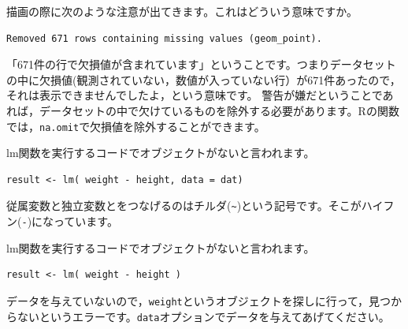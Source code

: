 \documentclass{ltjsbook}
\begin{document}

\begin{FAQ}{描画の際に次のような注意が出てきます。これはどういう意味ですか。}{}
\begin{verbatim}Removed 671 rows containing missing values (geom_point).\end{verbatim}
「671件の行で欠損値が含まれています」ということです。つまりデータセットの中に欠損値(観測されていない，数値が入っていない行）が671件あったので，それは表示できませんでしたよ，という意味です。
警告が嫌だということであれば，データセットの中で欠けているものを除外する必要があります。Rの関数では，\verb|na.omit|で欠損値を除外することができます。
\end{FAQ}

\begin{FAQ}{lm関数を実行するコードでオブジェクトがないと言われます。}{}
\begin{verbatim}
result <- lm( weight - height, data = dat)
\end{verbatim}
従属変数と独立変数とをつなげるのはチルダ(\verb|~|)という記号です。そこがハイフン(\verb|-|)になっています。
\end{FAQ}

\begin{FAQ}{lm関数を実行するコードでオブジェクトがないと言われます。}{}
\begin{verbatim}
result <- lm( weight - height )
\end{verbatim}
データを与えていないので，\verb|weight|というオブジェクトを探しに行って，見つからないというエラーです。\verb|data|オプションでデータを与えてあげてください。
\end{FAQ}
\end{document}

